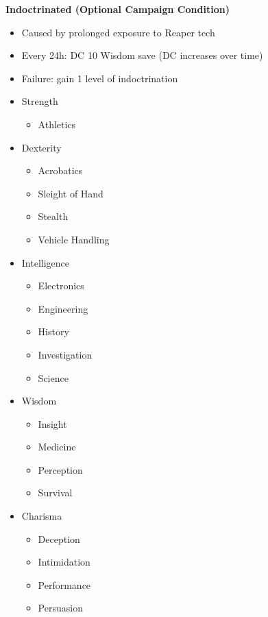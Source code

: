 \begin{scifitablebox}[screenbox,title=\textcolor{PanelGlow}{Conditions (Quick Reference)}]
\textbf{Indoctrinated (Optional Campaign Condition)}
\begin{itemize}
\item Caused by prolonged exposure to Reaper tech
\item Every 24h: DC 10 Wisdom save (DC increases over time)
\item Failure: gain 1 level of indoctrination
\end{itemize}

\end{scifitablebox}



\begin{scifitablebox}[screenbox,title=\textcolor{PanelGlow}{Player Skills}]
\begin{itemize}
  \item Strength
  \begin{itemize}
    \item Athletics
  \end{itemize}
  \item Dexterity
  \begin{itemize}
    \item Acrobatics
    \item Sleight of Hand
    \item Stealth
    \item Vehicle Handling
  \end{itemize}
  \item Intelligence
  \begin{itemize}
    \item Electronics
    \item Engineering
    \item History
    \item Investigation
    \item Science
  \end{itemize}
  \item Wisdom
  \begin{itemize}
    \item Insight
    \item Medicine
    \item Perception
    \item Survival
  \end{itemize}
  \item Charisma
  \begin{itemize}
    \item Deception
    \item Intimidation
    \item Performance
    \item Persuasion
  \end{itemize}
\end{itemize}  
\end{scifitablebox}


